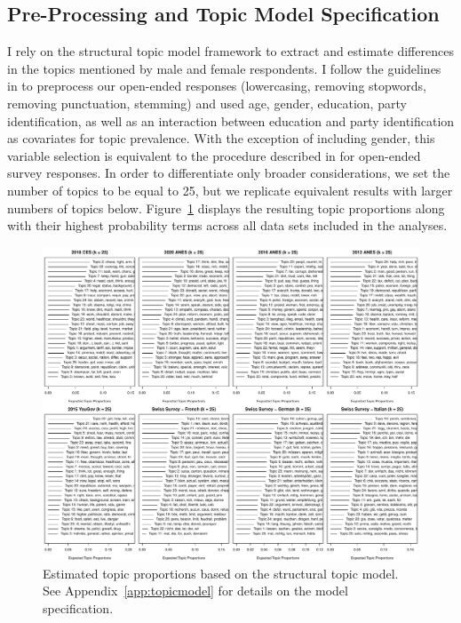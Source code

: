 \clearpage
\subsection{Pre-Processing and Topic Model Specification}

I rely on the structural topic model framework to extract and estimate differences in the topics mentioned by male and female respondents. I follow the guidelines in \citet{roberts2014structural} to preprocess our open-ended responses (lowercasing, removing stopwords, removing punctuation, stemming) and used age, gender, education, party identification, as well as an interaction between education and party identification as covariates for topic prevalence. With the exception of including gender, this variable selection is equivalent to the procedure described in \citet{roberts2014structural} for open-ended survey responses. In order to differentiate only broader considerations, we set the number of topics to be equal to 25, but we replicate equivalent results with larger numbers of topics below. Figure~\ref{fig:stm_prop} displays the resulting topic proportions along with their highest probability terms across all data sets included in the analyses.

\begin{figure}[h]\centering
\includegraphics[width=\textwidth]{../fig/stm_prop.pdf}
\caption[Estimated topic proportions based on the structural topic model]{Estimated topic proportions based on the structural topic model. See Appendix~\ref{app:topicmodel} for details on the model specification.}\label{fig:stm_prop}
\end{figure}


